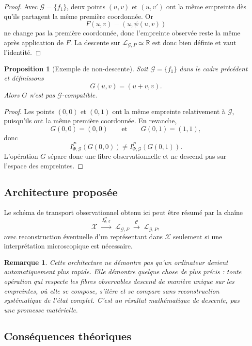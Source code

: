 \documentclass[11pt,a4paper]{article}
\newtheorem{proposition}{Proposition}
\newtheorem{remark}{Remarque}
\begin{document}
\begin{appendices}
\begin{proof}
Avec \(\mathcal G=\{f_1\}\), deux points \((u,v)\) et \((u,v')\) ont la même empreinte dès qu'ils partagent la même première coordonnée. Or
\[
F(u,v)=(u,\psi(u,v))
\]
ne change pas la première coordonnée, donc l'empreinte observée reste la même après application de \(F\). La descente sur \(\mathcal L_{\mathcal G,P}\simeq\mathbb R\) est donc bien définie et vaut l'identité.
\end{proof}

\begin{proposition}[Exemple de non-descente]
Soit \(\mathcal G=\{f_1\}\) dans le cadre précédent et définissons
\[
G(u,v)=(u+v,v).
\]
Alors \(G\) n'est pas \(\mathcal G\)-compatible.
\end{proposition}

\begin{proof}
Les points \((0,0)\) et \((0,1)\) ont la même empreinte relativement à \(\mathcal G\), puisqu'ils ont la même première coordonnée. En revanche,
\[
G(0,0)=(0,0)
\qquad\text{et}\qquad
G(0,1)=(1,1),
\]
donc
\[
I_{\Phi,\mathcal G}^P(G(0,0))\neq I_{\Phi,\mathcal G}^P(G(0,1)).
\]
L'opération \(G\) sépare donc une fibre observationnelle et ne descend pas sur l'espace des empreintes.
\end{proof}

\subsection{Architecture proposée}

Le schéma de transport observationnel obtenu ici peut être résumé par la chaîne
\[
\mathcal X
\;\xrightarrow{\ I_{\Phi,\mathcal G}^P\ }\;
\mathcal L_{\mathcal G,P}
\;\xrightarrow{\ \mathcal C\ }\;
\mathcal L_{\mathcal G,P},
\]
avec reconstruction éventuelle d'un représentant dans \(\mathcal X\) seulement si une interprétation microscopique est nécessaire.

\begin{remark}
Cette architecture ne démontre pas qu'un ordinateur devient automatiquement plus rapide. Elle démontre quelque chose de plus précis : toute opération qui respecte les fibres observables descend de manière unique sur les empreintes, où elle se compose, s'itère et se compare sans reconstruction systématique de l'état complet. C'est un résultat mathématique de descente, pas une promesse matérielle.
\end{remark}

\subsection{Conséquences théoriques}


\end{appendices}
\end{document}
